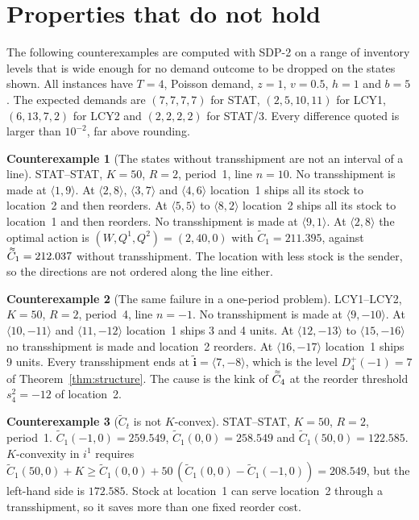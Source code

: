 \documentclass[11pt]{article}
\DeclareRobustCommand{\dbtilde}[1]{\accentset{\approx}{#1}}
\renewcommand{\vec}[1]{\boldsymbol{#1}}
\newcommand{\Ct}{\widetilde{C}}
\newcommand{\Cq}{\dbtilde{C}}
\theoremstyle{definition}
\newtheorem{example}{Counterexample}
\begin{document}
\section{Properties that do not hold}\label{sec:false}

The following counterexamples are computed with SDP-2 on a range of inventory levels that is wide enough for no demand outcome to be dropped on the states shown. All instances have $T=4$, Poisson demand, $z=1$, $v=0.5$, $h=1$ and $b=5$. The expected demands are $(7,7,7,7)$ for STAT, $(2,5,10,11)$ for LCY1, $(6,13,7,2)$ for LCY2 and $(2,2,2,2)$ for STAT/3. Every difference quoted is larger than $10^{-2}$, far above rounding.

\begin{example}[The states without transshipment are not an interval of a line]\label{ex:interval}
STAT--STAT, $K=50$, $R=2$, period~1, line $n=10$. No transshipment is made at $\langle1,9\rangle$. At $\langle2,8\rangle$, $\langle3,7\rangle$ and $\langle4,6\rangle$ location~1 ships all its stock to location~2 and then reorders. At $\langle5,5\rangle$ to $\langle8,2\rangle$ location~2 ships all its stock to location~1 and then reorders. No transshipment is made at $\langle9,1\rangle$. At $\langle2,8\rangle$ the optimal action is $(W,Q^1,Q^2)=(2,40,0)$ with $\Ct_1=211.395$, against $\Cq_1=212.037$ without transshipment. The location with less stock is the sender, so the directions are not ordered along the line either.
\end{example}

\begin{example}[The same failure in a one-period problem]\label{ex:last}
LCY1--LCY2, $K=50$, $R=2$, period~4, line $n=-1$. No transshipment is made at $\langle9,-10\rangle$. At $\langle10,-11\rangle$ and $\langle11,-12\rangle$ location~1 ships 3 and 4 units. At $\langle12,-13\rangle$ to $\langle15,-16\rangle$ no transshipment is made and location~2 reorders. At $\langle16,-17\rangle$ location~1 ships 9 units. Every transshipment ends at $\tilde{\vec{i}}=\langle7,-8\rangle$, which is the level $D^+_4(-1)=7$ of Theorem~\ref{thm:structure}. The cause is the kink of $\Cq_4$ at the reorder threshold $s^2_4=-12$ of location~2.
\end{example}

\begin{example}[$\Ct_t$ is not $K$-convex]\label{ex:kconv}
STAT--STAT, $K=50$, $R=2$, period~1. $\Ct_1(-1,0)=259.549$, $\Ct_1(0,0)=258.549$ and $\Ct_1(50,0)=122.585$. $K$-convexity in $i^1$ requires $\Ct_1(50,0)+K\ge\Ct_1(0,0)+50\,(\Ct_1(0,0)-\Ct_1(-1,0))=208.549$, but the left-hand side is $172.585$. Stock at location~1 can serve location~2 through a transshipment, so it saves more than one fixed reorder cost.
\end{example}
\end{document}
